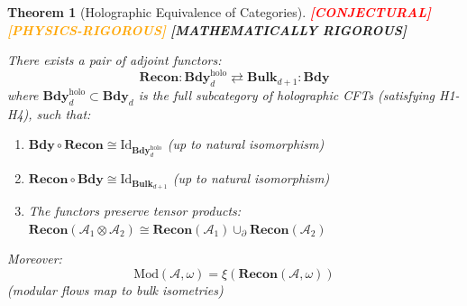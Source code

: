 \documentclass[12pt,a4paper]{article}
\newtheorem{theorem}{Theorem}[section]
\newcommand{\rigormark}[1]{%
  \ifcase#1
    \textcolor{red}{\textbf{[CONJECTURAL]}}%
  \or
    \textcolor{orange}{\textbf{[PHYSICS-RIGOROUS]}}%
  \or
    \textcolor{green!50!black}{\textbf{[MATHEMATICALLY RIGOROUS]}}%
  \fi
}
\begin{document}
\begin{theorem}[Holographic Equivalence of Categories]\label{thm:cat-equiv}
\rigormark{1}

There exists a pair of adjoint functors:
\begin{equation}
\mathbf{Recon}: \mathbf{Bdy}_d^{\text{holo}} \rightleftarrows \mathbf{Bulk}_{d+1} : \mathbf{Bdy}
\end{equation}
where $\mathbf{Bdy}_d^{\text{holo}} \subset \mathbf{Bdy}_d$ is the full subcategory of holographic CFTs (satisfying H1-H4), such that:
\begin{enumerate}
    \item $\mathbf{Bdy} \circ \mathbf{Recon} \cong \text{Id}_{\mathbf{Bdy}_d^{\text{holo}}}$ (up to natural isomorphism)
    \item $\mathbf{Recon} \circ \mathbf{Bdy} \cong \text{Id}_{\mathbf{Bulk}_{d+1}}$ (up to natural isomorphism)
    \item The functors preserve tensor products: $\mathbf{Recon}(\mathcal{A}_1 \otimes \mathcal{A}_2) \cong \mathbf{Recon}(\mathcal{A}_1) \cup_\partial \mathbf{Recon}(\mathcal{A}_2)$
\end{enumerate}
Moreover:
\begin{equation}
\text{Mod}(\mathcal{A}, \omega) = \xi(\mathbf{Recon}(\mathcal{A}, \omega))
\end{equation}
(modular flows map to bulk isometries)
\end{theorem}
\end{document}

